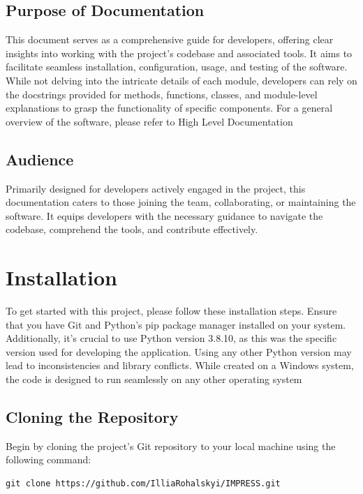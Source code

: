 \documentclass{report}
\begin{document}
\section{Purpose of Documentation}

This document serves as a comprehensive guide for developers, offering clear insights into working with the project's codebase and associated tools. It aims to facilitate seamless installation, configuration, usage, and testing of the software. While not delving into the intricate details of each module, developers can rely on the docstrings provided for methods, functions, classes, and module-level explanations to grasp the functionality of specific components. For a general overview of the software, please refer to High Level Documentation

\section{Audience}

Primarily designed for developers actively engaged in the project, this documentation caters to those joining the team, collaborating, or maintaining the software. It equips developers with the necessary guidance to navigate the codebase, comprehend the tools, and contribute effectively.


\chapter{Installation}

To get started with this project, please follow these installation steps. Ensure that you have Git and Python's pip package manager installed on your system. Additionally, it's crucial to use Python version 3.8.10, as this was the specific version used for developing the application. Using any other Python version may lead to inconsistencies and library conflicts. While created on a Windows system, the code is designed to run seamlessly on any other operating system

\section{Cloning the Repository}

Begin by cloning the project's Git repository to your local machine using the following command:

\begin{verbatim}
git clone https://github.com/IlliaRohalskyi/IMPRESS.git
\end{verbatim}
\end{document}
